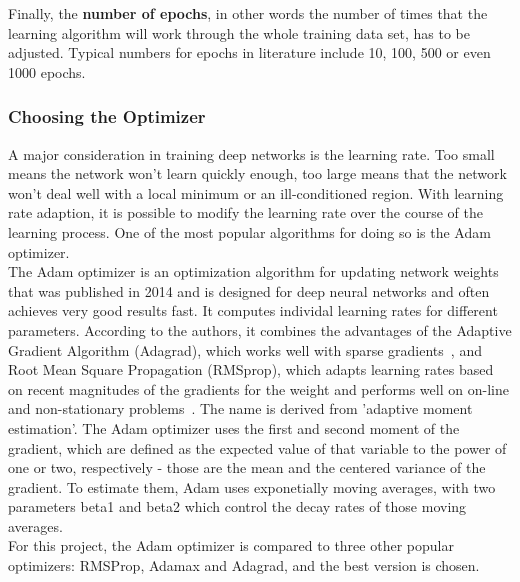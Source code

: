\documentclass[
	a4paper,
	pagesize,
	pdftex,
	12pt,
	twoside, %
	BCOR=5mm, %
	ngerman,
	fleqn,
	final,
	]{scrartcl}
\begin{document}
Finally, the \textbf{number of epochs}, in other words the number of times that the learning algorithm will work through the whole training data set, has to be adjusted. Typical numbers for epochs in literature include 10, 100, 500 or even 1000 epochs.\\



\subsubsection{Choosing the Optimizer}

A major consideration in training deep networks is the learning rate. Too small means the network won't learn quickly enough, too large means that the network won't deal well with a local minimum or an ill-conditioned region. With learning rate adaption, it is possible to modify the learning rate over the course of the learning process. One of the most popular algorithms for doing so is the Adam optimizer.\\
The Adam optimizer is an optimization algorithm for updating network weights that was published in 2014 \cite{Kingma.2014}
and is designed for deep neural networks and often achieves very good results fast. It computes individal learning rates for different parameters. According to the authors, it combines the advantages of the Adaptive Gradient Algorithm (Adagrad), which works well with sparse gradients~\cite{Duchi.2011}, and Root Mean Square Propagation (RMSprop), which adapts learning rates based on recent magnitudes of the gradients for the weight and performs well on on-line and non-stationary problems~\cite{Tieleman.2012}. The name is derived from 'adaptive moment estimation'. The Adam optimizer uses the first and second moment of the gradient, which are defined as the expected value of that variable to the power of one or two, respectively - those are the mean and the centered variance of the gradient. To estimate them, Adam uses exponetially moving averages, with two parameters beta1 and beta2 which control the decay rates of those moving averages. \\
For this project, the Adam optimizer is compared to three other popular optimizers: RMSProp, Adamax and Adagrad, and the best version is chosen.
\end{document}

